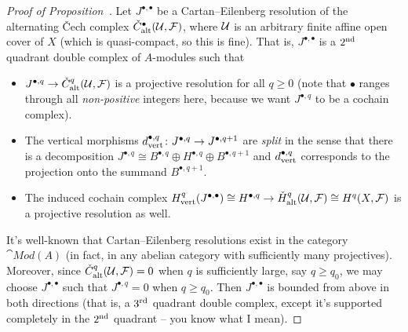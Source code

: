 \documentclass[a4paper,parskip=half,numbers=enddot, DIV=12]{scrreprt}
\renewcommand{\geq}{\geqslant}
\begin{document}
\begin{proof}[Proof of Proposition~]
	Let $J^{\bullet,\bullet}$ be a Cartan--Eilenberg resolution of the alternating \v Cech complex $\check{C}_{\mathrm{alt}}^\bullet(\mathcal{U},\mathcal{F})$, where $\mathcal{U}$ is an arbitrary finite affine open cover of $X$ (which is quasi-compact, so this is fine). That is, $J^{\bullet,\bullet}$ is a $2^{\text{nd}}$ quadrant double complex of $A$-modules such that
	\begin{itemize}
		\item $J^{\bullet,q}\morphism\check{C}_\alt^q(\Uu,\Ff)$ is a projective resolution for all $q\geq 0$ (note that $\bullet$ ranges through all \emph{non-positive} integers here, because we want $J^{\bullet,q}$ to be a cochain complex).
		\item The vertical morphisms $d_\ver^{\bullet,q}\colon J^{\bullet,q}\morphism J^{\bullet,q+1}$ are \emph{split} in the sense that there is a decomposition $J^{\bullet,q}\cong B^{\bullet,q}\oplus H^{\bullet,q}\oplus B^{\bullet,q+1}$ and $d_{\mathrm{vert}}^{\bullet,q}$ corresponds to the projection onto the summand $B^{\bullet,q+1}$.
		\item The induced cochain complex $H_\ver^q(J^{\bullet,\bullet})\cong H^{\bullet,q}\morphism \check{H}_\alt^q(\Uu,\Ff)\cong H^q(X,\Ff)$ is a projective resolution as well.
	\end{itemize}
It's well-known that Cartan--Eilenberg resolutions exist in the category $\cat{Mod}(A)$ (in fact, in any abelian category with sufficiently many projectives). Moreover, since $\check{C}^q_{\mathrm{alt}}(\mathcal{U},\mathcal{F})=0$ when $q$ is sufficiently large, say $q\geq q_0$, we may choose $J ^{\bullet,\bullet}$ such that $J^{\bullet,q}=0$ when $q\geq q_0$. Then $J^{\bullet,\bullet}$ is bounded from above in both directions (that is, a $3^{\text{rd}}$ quadrant double complex, except it's supported completely in the $2^{\text{nd}}$ quadrant -- you know what I mean).


\end{proof}
\end{document}
